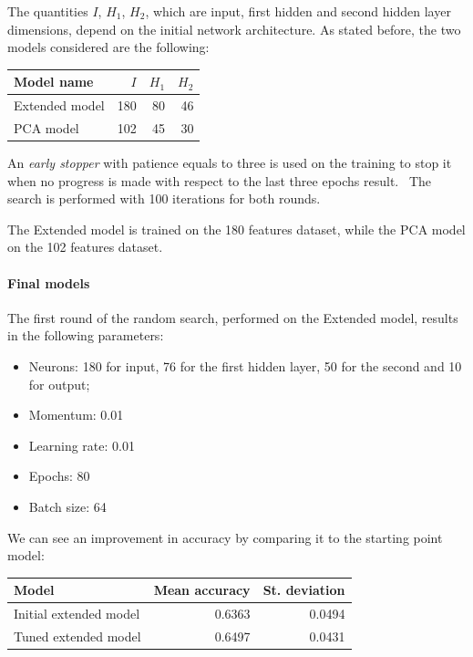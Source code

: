 The quantities $I$, $H_1$, $H_2$, which are input, first hidden and second hidden 
layer dimensions, depend on the initial network architecture.
As stated before, the two models considered are the following: 
\begin{center}
    \begin{tabular}{ |l|r|r|r|} 
        \hline
        Model name & $I$ & $H_1$ & $H_2$ \\
        \hline
        Extended model & 180 & 80 & 46 \\
        PCA model & 102 & 45 & 30 \\
        \hline
    \end{tabular}
\end{center}

An \emph{early stopper} with patience equals to three is used on the training to stop it when no progress is made with 
respect to the last three epochs result.~\cite{early}
The search is performed with 100 iterations for both rounds.

The Extended model is trained on the 180 features dataset, 
while the PCA model on the 102 features dataset.

\paragraph{Final models}
The first round of the random search, performed on the Extended model, results 
in the following parameters:
\begin{itemize}
    \item Neurons: 180 for input, 76 for the first hidden layer, 50 for the second and 10 for output;
    \item Momentum: 0.01
    \item Learning rate: 0.01
    \item Epochs: 80
    \item Batch size: 64
\end{itemize}
We can see an improvement in accuracy by comparing it to the starting point model:
\begin{center}
    \begin{tabular}{ |l|r|r| } 
        \hline
        Model & Mean accuracy & St. deviation \\
        \hline
        Initial extended model & 0.6363 & 0.0494\\
        Tuned extended model & 0.6497 & 0.0431\\
        \hline
    \end{tabular}
\end{center}

